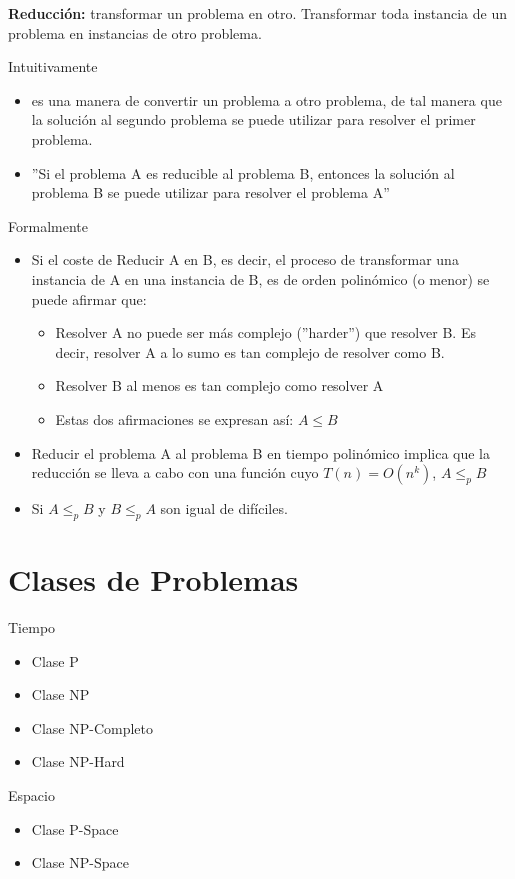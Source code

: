 \textbf{Reducción:} transformar un problema en otro. Transformar toda instancia de un problema en instancias de otro problema.

Intuitivamente
\begin{itemize}
  \item es una manera de convertir un problema a otro problema, de tal manera que la solución al segundo problema se puede utilizar para resolver el primer problema.
  \item ''Si el problema A es reducible al problema B, entonces la solución al problema B se
  puede utilizar para resolver el problema A''
\end{itemize}

Formalmente
\begin{itemize}
  \item Si el coste de Reducir A en B, es decir, el proceso de transformar una instancia de A en una instancia de B, es de orden polinómico (o menor) se puede afirmar que:
  \begin{itemize}
    \item Resolver A no puede ser más complejo (''harder'') que resolver B. Es decir, resolver A a lo sumo es tan complejo de resolver como B.
    \item Resolver B al menos es tan complejo como resolver A
    \item Estas dos afirmaciones se expresan así: $A \leq B$
  \end{itemize}
  \item Reducir el problema A al problema B en tiempo polinómico implica que la reducción se lleva a cabo con una función cuyo $T(n)=O(n^k)$, $A \leq_p B$
  \item Si $A \leq_p B$ y $B \leq_p A$ son igual de difíciles.
\end{itemize}

\section{Clases de Problemas}
Tiempo
\begin{itemize}
  \item Clase P
  \item Clase NP
  \item Clase NP-Completo 
  \item Clase NP-Hard
\end{itemize}

Espacio
\begin{itemize}
  \item Clase P-Space
  \item Clase NP-Space
\end{itemize}

